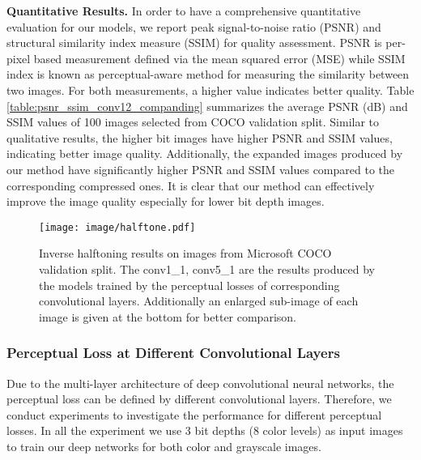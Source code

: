 \documentclass[journal]{IEEEtran}
\begin{document}

\textbf{Quantitative Results.}
In order to have a comprehensive quantitative evaluation for our models, we report peak signal-to-noise ratio (PSNR) and structural similarity index measure (SSIM) \cite{wang2004image} for quality assessment. PSNR is per-pixel based measurement defined via the mean squared error (MSE) while SSIM index is known as perceptual-aware method for measuring the similarity between two images. For both measurements, a higher value indicates better quality. Table \ref{table:psnr_ssim_conv12_companding} summarizes the average PSNR (dB) and SSIM values of 100 images selected from COCO validation split. Similar to qualitative results, the higher bit images have higher PSNR and SSIM values, indicating better image quality. Additionally, the expanded images produced by our method have significantly higher PSNR and SSIM values compared to the corresponding compressed ones. It is clear that our method can effectively improve the image quality especially for lower bit depth images.


\begin{figure*}[!tb]
\centering
  \texttt{[image: image/halftone.pdf]}
  \caption{Inverse halftoning results on images from Microsoft COCO validation split. The conv1\_1, conv5\_1 are the results produced by the models trained by the perceptual losses of corresponding convolutional layers. Additionally an enlarged sub-image of each image is given at the bottom for better comparison.}
  \label{fig:halftone}
\end{figure*}

\subsubsection{Perceptual Loss at Different Convolutional Layers}
Due to the multi-layer architecture of deep convolutional neural networks, the perceptual loss can be defined by different convolutional layers. Therefore, we conduct experiments to investigate the performance for different perceptual losses. In all the experiment we use 3 bit depths (8 color levels) as input images to train our deep networks for both color and grayscale images.
\end{document}
